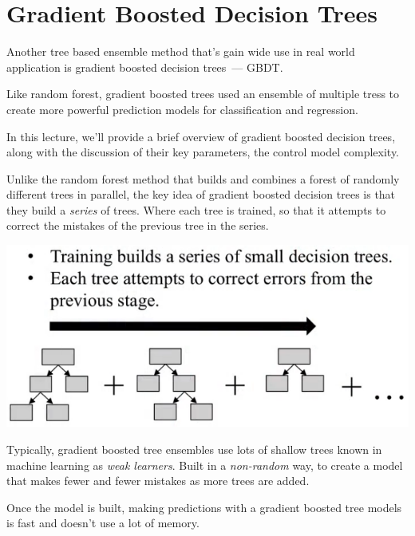\section{Gradient Boosted Decision Trees}
\begin{multicols}{2}

Another tree based ensemble method that's gain wide use in real world application is gradient boosted decision trees~--- GBDT. 

Like random forest, gradient boosted trees used an ensemble of multiple tress to create more powerful prediction models for classification and regression. 

In this lecture, we'll provide a brief overview of gradient boosted decision trees, along with the discussion of their key parameters, the control model complexity. 

Unlike the random forest method that builds and combines a forest of randomly different trees in parallel, the key idea of gradient boosted decision trees is that they build a \emph{series} of trees. Where each tree is trained, so that it attempts to correct the mistakes of the previous tree in the series. 

\begin{center}
	\includegraphics[width=\linewidth]{img/GBDT-1.png} 
\end{center}

Typically, gradient boosted tree ensembles use lots of shallow trees known in machine learning as \emph{weak learners}. Built in a \emph{non-random} way, to create a model that makes fewer and fewer mistakes as more trees are added.  

Once the model is built, making predictions with a gradient boosted tree models is fast and doesn't use a lot of memory. 


\end{multicols}
